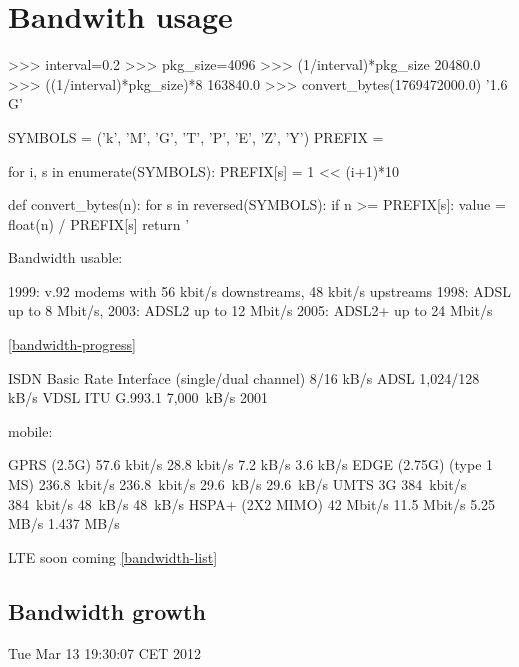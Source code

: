 \section{Bandwith usage}
>>> interval=0.2
>>> pkg_size=4096
>>> (1/interval)*pkg_size
20480.0
>>> ((1/interval)*pkg_size)*8
163840.0
>>> convert_bytes(1769472000.0)
'1.6 G'


SYMBOLS = ('k', 'M', 'G', 'T', 'P', 'E', 'Z', 'Y')
PREFIX = {}

for i, s in enumerate(SYMBOLS):
    PREFIX[s] = 1 << (i+1)*10

def convert_bytes(n):
    for s in reversed(SYMBOLS):
        if n >= PREFIX[s]:
            value = float(n) / PREFIX[s] 
            return '%

Bandwidth usable:

1999: v.92 modems with 56 kbit/s downstreams, 48 kbit/s upstreams
1998: ADSL up to 8 Mbit/s,
2003: ADSL2 up to 12 Mbit/s
2005: ADSL2+ up to 24 Mbit/s

\ref{bandwidth-progress}

ISDN Basic Rate Interface (single/dual channel) 8/16 kB/s
ADSL 1,024/128 kB/s 
VDSL ITU G.993.1    7,000 kB/s   2001

mobile:

GPRS (2.5G) 57.6 kbit/s 28.8 kbit/s 7.2 kB/s    3.6 kB/s
EDGE (2.75G) (type 1 MS)    236.8 kbit/s    236.8 kbit/s    29.6 kB/s   29.6 kB/s
UMTS 3G 384 kbit/s  384 kbit/s  48 kB/s 48 kB/s
HSPA+ (2X2 MIMO)    42 Mbit/s   11.5 Mbit/s 5.25 MB/s   1.437 MB/s

LTE soon coming
\ref{bandwidth-list}

\subsection{Bandwidth growth}
Tue Mar 13 19:30:07 CET 2012
